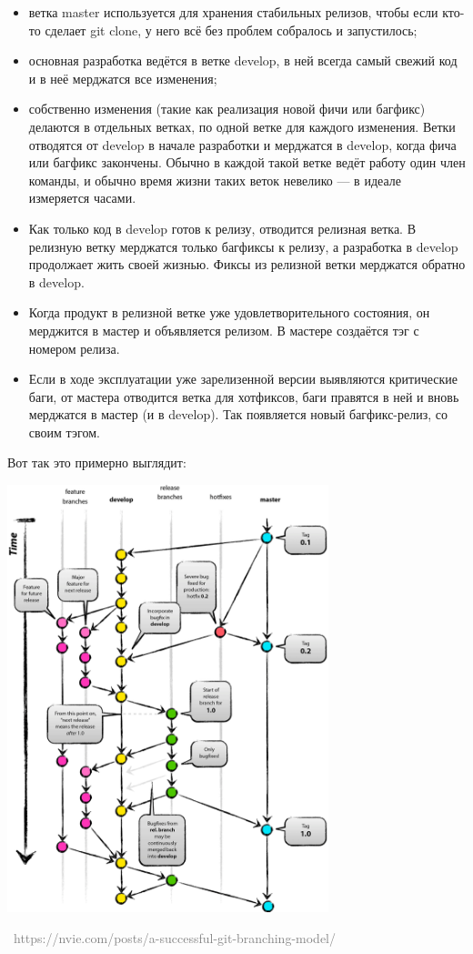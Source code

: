 \documentclass[a5paper]{article}
\newcommand{\attribution}[1] {
\vspace{-5mm}\begin{flushright}\begin{scriptsize}\textcolor{gray}{\textcopyright\, #1}\end{scriptsize}\end{flushright}
}
\begin{document}
\begin{itemize}
	\item ветка master используется для хранения стабильных релизов, чтобы если кто-то сделает git clone, у него всё без проблем собралось и запустилось;
	\item основная разработка ведётся в ветке develop, в ней всегда самый свежий код и в неё мерджатся все изменения;
	\item собственно изменения (такие как реализация новой фичи или багфикс) делаются в отдельных ветках, по одной ветке для каждого изменения. Ветки отводятся от develop в начале разработки и мерджатся в develop, когда фича или багфикс закончены. Обычно в каждой такой ветке ведёт работу один член команды, и обычно время жизни таких веток невелико --- в идеале измеряется часами.
	\item Как только код в develop готов к релизу, отводится релизная ветка. В релизную ветку мерджатся только багфиксы к релизу, а разработка в develop продолжает жить своей жизнью. Фиксы из релизной ветки мерджатся обратно в develop.
	\item Когда продукт в релизной ветке уже удовлетворительного состояния, он мерджится в мастер и объявляется релизом. В мастере создаётся тэг с номером релиза.
	\item Если в ходе эксплуатации уже зарелизенной версии выявляются критические баги, от мастера отводится ветка для хотфиксов, баги правятся в ней и вновь мерджатся в мастер (и в develop). Так появляется новый багфикс-релиз, со своим тэгом.
\end{itemize}

Вот так это примерно выглядит:

\begin{center}
	\includegraphics[width=0.7\textwidth]{gitFlow.png}
	\attribution{https://nvie.com/posts/a-successful-git-branching-model/}
\end{center}
\end{document}
